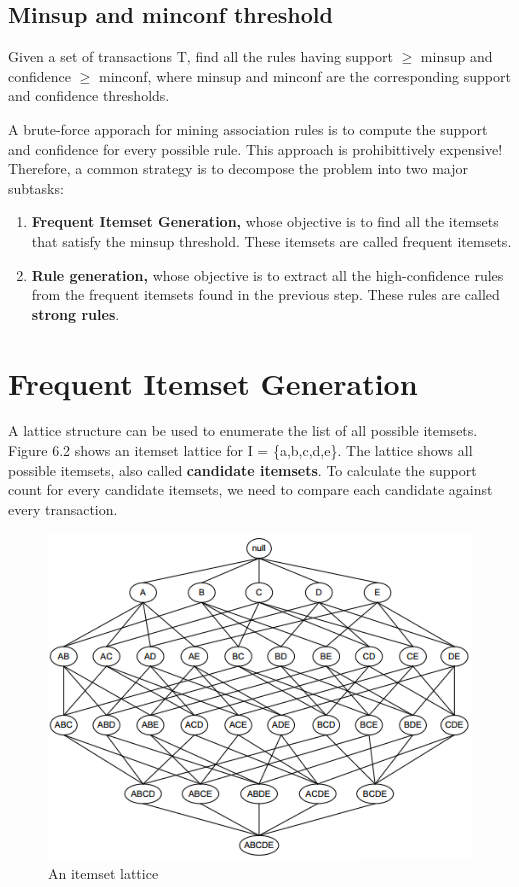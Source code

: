 		\subsection*{Minsup and minconf threshold}
		Given a set of transactions T, find all the rules having support $\geq$ minsup and \\
		confidence $\geq$ minconf, where minsup and minconf are the corresponding support
		and confidence thresholds. 

		A brute-force apporach for mining association rules is to compute the support and
		confidence for every possible rule. This approach is prohibittively expensive!
		Therefore, a common strategy is to decompose the problem into two major subtasks:

		\begin{enumerate}
			\item {\bf Frequent Itemset Generation,} whose objective is to find all the 
			itemsets that satisfy the minsup threshold. These itemsets are called 
			frequent itemsets. 
			\item {\bf Rule generation,} whose objective is to extract all the high-confidence
			rules from the frequent itemsets found in the previous step. These rules
			are called {\bf strong rules}.
		\end{enumerate}

	\clearpage 
	\section{Frequent Itemset Generation}

		A lattice structure can be used to enumerate the list of all possible itemsets.
		Figure 6.2 shows an itemset lattice for I = \{a,b,c,d,e\}. The lattice shows
		all possible itemsets, also called {\bf candidate itemsets}. To calculate
		the support count for every candidate itemsets, we need to compare each candidate
		against every transaction.

		\begin{figure}[H]
			\centering
			\includegraphics[scale=0.5]{pics/lattice.png}
			\caption{An itemset lattice}
		\end{figure}

